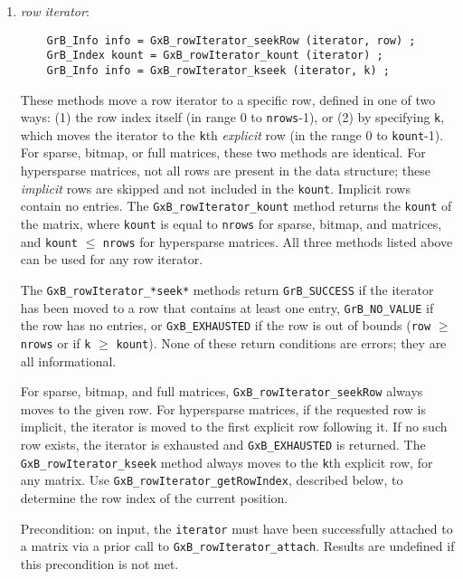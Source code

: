 \documentclass[12pt]{article}
\begin{document}
    \begin{enumerate}
    \item {\em row iterator}:
    {\footnotesize
    \begin{verbatim}
    GrB_Info info = GxB_rowIterator_seekRow (iterator, row) ;
    GrB_Index kount = GxB_rowIterator_kount (iterator) ;
    GrB_Info info = GxB_rowIterator_kseek (iterator, k) ; \end{verbatim}}

        These methods move a row iterator to a specific row, defined in one of
        two ways: (1) the row index itself (in range 0 to \verb'nrows'-1), or
        (2) by specifying \verb'k', which moves the iterator to the \verb'k'th
        {\em explicit} row (in the range 0 to \verb'kount'-1). For sparse,
        bitmap, or full matrices, these two methods are identical.  For
        hypersparse matrices, not all rows are present in the data structure;
        these {\em implicit} rows are skipped and not included in the
        \verb'kount'.  Implicit rows contain no entries.  The
        \verb'GxB_rowIterator_kount' method returns the \verb'kount' of the
        matrix, where \verb'kount' is equal to \verb'nrows' for sparse, bitmap,
        and matrices, and \verb'kount' $\le$ \verb'nrows' for hypersparse
        matrices.  All three methods listed above can be used for any row
        iterator.

        The \verb'GxB_rowIterator_*seek*' methods return \verb'GrB_SUCCESS' if
        the iterator has been moved to a row that contains at least one entry,
        \verb'GrB_NO_VALUE' if the row has no entries, or \verb'GxB_EXHAUSTED'
        if the row is out of bounds (\verb'row' $\ge$ \verb'nrows' or
        if \verb'k' $\ge$ \verb'kount').
        None of these return conditions are
        errors; they are all informational.

        For sparse, bitmap, and full matrices, \verb'GxB_rowIterator_seekRow'
        always moves to the given row.  For hypersparse matrices, if the
        requested row is implicit, the iterator is moved to the first
        explicit row following it.  If no such row exists, the iterator
        is exhausted and \verb'GxB_EXHAUSTED' is returned.
        The \verb'GxB_rowIterator_kseek' method always moves to the \verb'k'th
        explicit row, for any matrix.
        Use \verb'GxB_rowIterator_getRowIndex', described below, to determine
        the row index of the current position.

        Precondition: on input, the \verb'iterator' must have been successfully
        attached to a matrix via a prior call to \verb'GxB_rowIterator_attach'.
        Results are undefined if this precondition is not met.


\end{enumerate}
\end{document}
